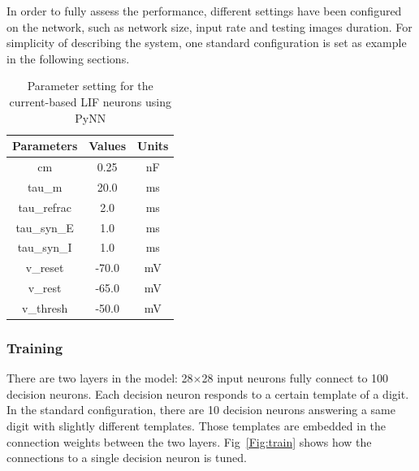 In order to fully assess the performance, different settings have been configured on the network, such as network size, input rate and testing images duration.
For simplicity of describing the system, one standard configuration is set as example in the following sections.
\begin{table}[hbbp]
\centering
\caption{\label{tbl:pynnSetting}Parameter setting for the current-based LIF neurons using PyNN}
\bgroup
\def\arraystretch{1.1}
  \begin{tabular}{c|c|c}
  Parameters & Values & Units \\
  \hline
  cm & 0.25 & nF	\\
  tau\_m & 20.0 & ms\\
  tau\_refrac & 2.0 & ms\\
  tau\_syn\_E & 1.0 & ms\\
  tau\_syn\_I & 1.0 & ms\\
  v\_reset & -70.0 & mV\\
  v\_rest & -65.0 & mV\\
  v\_thresh & -50.0 & mV\\
  \end{tabular}
\egroup
\end{table}

\subsubsection{Training}

There are two layers in the model: 28$\times$28 input neurons fully connect to 100 decision neurons.
Each decision neuron responds to a certain template of a digit.
In the standard configuration, there are 10 decision neurons answering a same digit with slightly different templates.
Those templates are embedded in the connection weights between the two layers.
Fig~\ref{Fig:train} shows how the connections to a single decision neuron is tuned.

